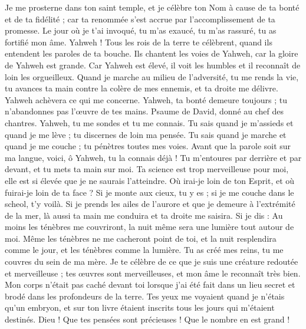 \begin{multicols}{2}
Je me prosterne dans ton saint temple, et je célèbre ton Nom à cause de ta bonté et de ta fidélité ; car ta renommée s’est accrue par l’accomplissement de ta promesse.
Le jour où je t’ai invoqué, tu m'as exaucé, tu m'as rassuré, tu as fortifié mon âme.
Yahweh ! Tous les rois de la terre te célèbrent, quand ils entendent les paroles de ta bouche.
Ils chantent les voies de Yahweh, car la gloire de Yahweh est grande.
Car Yahweh est élevé, il voit les humbles et il reconnaît de loin les orgueilleux.
Quand je marche au milieu de l'adversité, tu me rends la vie, tu avances ta main contre la colère de mes ennemis, et ta droite me délivre.
Yahweh achèvera ce qui me concerne. Yahweh, ta bonté demeure toujours ; tu n'abandonnes pas l’œuvre de tes mains.
\VerseOne{}Psaume de David, donné au chef des chantres. Yahweh, tu me sondes et tu me connais.
Tu sais quand je m'assieds et quand je me lève ; tu discernes de loin ma pensée.
Tu sais quand je marche et quand je me couche ; tu pénètres toutes mes voies.
Avant que la parole soit sur ma langue, voici, ô Yahweh, tu la connais déjà !
Tu m’entoures par derrière et par devant, et tu mets ta main sur moi.
Ta science est trop merveilleuse pour moi, elle est si élevée que je ne saurais l’atteindre.
Où irai-je loin de ton Esprit, et où fuirai-je loin de ta face ?
Si je monte aux cieux, tu y es ; si je me couche dans le scheol, t'y voilà.
Si je prends les ailes de l’aurore et que je demeure à l’extrémité de la mer,
là aussi ta main me conduira et ta droite me saisira.
Si je dis : Au moins les ténèbres me couvriront, la nuit même sera une lumière tout autour de moi.
Même les ténèbres ne me cacheront point de toi, et la nuit resplendira comme le jour, et les ténèbres comme la lumière.
Tu as créé mes reins, tu me couvres du sein de ma mère.
Je te célèbre de ce que je suis une créature redoutée et merveilleuse ; tes œuvres sont merveilleuses, et mon âme le reconnaît très bien.
Mon corps n’était pas caché devant toi lorsque j'ai été fait dans un lieu secret et brodé dans les profondeurs de la terre.
Tes yeux me voyaient quand je n’étais qu’un embryon, et sur ton livre étaient inscrits tous les jours qui m’étaient destinés.
Dieu ! Que tes pensées sont précieuses ! Que le nombre en est grand !

\end{multicols}
